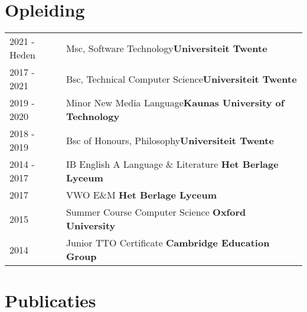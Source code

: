 \documentclass[a4paper,12pt]{article}
\begin{document}
\section{Opleiding}
\begin{tabularx}{\linewidth}{@{}l X@{}}	
2021 - Heden & Msc, Software Technology\hfill \textbf{Universiteit Twente} \\

2017 - 2021 & Bsc, Technical Computer Science\hfill \textbf{Universiteit Twente} \\ 

2019 - 2020 & Minor New Media Language\hfill \textbf{Kaunas University of Technology} \\

2018 - 2019 & Bsc of Honours, Philosophy\hfill \textbf{Universiteit Twente} \\

2014 - 2017 & IB English A Language \& Literature \hfill \textbf{Het Berlage Lyceum} \\

2017 & VWO E\&M \hfill \textbf{Het Berlage Lyceum} \\

2015 & Summer Course Computer Science \hfill \textbf{Oxford University} \\

2014 & Junior TTO Certificate \hfill \textbf{Cambridge Education Group} \\
\end{tabularx}

\section{Publicaties}
\begin{refsection}
\printbibliography[heading=none]
\end{refsection}

\end{document}
